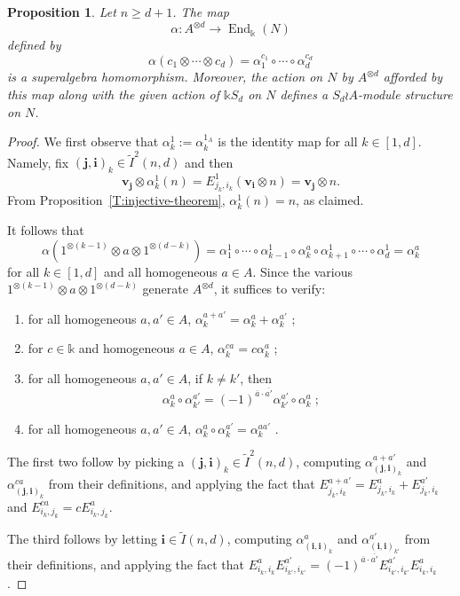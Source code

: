 \documentclass[11pt,reqno]{amsart} %
\newtheorem{proposition}[theorem]{Proposition}
\renewcommand{\k}{\mathds{k}}
\newcommand{\0}{\bar{0}}
\newcommand{\1}{\bar{1}}
\newcommand{\parity}[1]{\overline{#1}}
\newcommand{\wreath}{\wr}
\newcommand{\bv}{\mathbf{v}}
\newcommand{\SdwreathA}{S_{d} \wreath A}
\newcommand{\bi}{\mathbf{i}}
\newcommand{\bj}{\mathbf{j}}
\newcommand{\End}{\operatorname{End}}
\newcommand{\Itwo}{\tilde{I}^{2}(n,d)}
\newcommand{\tI}{\tilde{I}}
\numberwithin{equation}{subsection}
\begin{document}
\begin{proposition} \label{L:alpha-is-an-algebra-map} Let $n \geq d+1$.   The map 
\[
\alpha : A^{\otimes d} \to \End_{\k}(N)
\] defined by 
\[
\alpha(c_{1}\otimes \dotsb \otimes c_{d}) = \alpha_{1}^{c_{1}} \circ \dotsb \circ \alpha_{d}^{c_{d}}
\] is a superalgebra homomorphism.  Moreover, the action on $N$ by $A^{\otimes d}$ afforded by this map along with the given action of $\k S_{d}$ on $N$ defines a $\SdwreathA$-module structure on $N$.
\end{proposition}
\begin{proof} We first observe that $\alpha_{k}^{1}:=\alpha_{k}^{1_{A}}$ is the identity map for all $k \in [1,d]$.  Namely, fix $(\bj, \bi)_{k}\in \Itwo$ and then 
\[
 \bv_{\bj}^{} \otimes \alpha_{k}^{1}(n)   = E_{j_{k}, i_{k}}^{1} ( \bv_{\bi} \otimes n) =  \bv_{\bj}^{} \otimes n.
\]  From Proposition~\ref{T:injective-theorem}, $\alpha_{k}^{1}(n) = n$, as claimed.

It follows that 
\[
\alpha (1^{\otimes (k-1)} \otimes  a \otimes 1^{\otimes (d-k)}) = \alpha_{1}^{1} \circ \dotsb \circ \alpha_{k-1}^{1} \circ \alpha_{k}^{a} \circ \alpha_{k+1}^{1} \circ\dotsb \circ \alpha_{d}^{1} = \alpha_{k}^{a}
\]
for all $k \in [1,d]$ and all homogeneous $a \in A$.  Since the various $1^{\otimes (k-1)} \otimes  a \otimes 1^{\otimes (d-k)}$ generate $A^{\otimes d}$, it suffices to verify:
\begin{enumerate}
\item for all homogeneous $a, a' \in A$, $\alpha_{k}^{a+a'} = \alpha_{k}^{a}+\alpha_{k}^{a'}$ ;
\item for $c \in \k$ and homogeneous $a \in A$, $\alpha_{k}^{ca} = c\alpha_{k}^{a}$ ;
\item for all homogeneous $a, a' \in A$, if $k \neq k'$, then
\[
\alpha_{k}^{a} \circ \alpha_{k'}^{a'}  = (-1)^{\parity{a} \cdot \parity{a'}} \alpha_{k'}^{a'} \circ \alpha_{k}^{a} \; ;\]
\item for all homogeneous $a,a' \in A$, $\alpha_{k}^{a} \circ \alpha_{k}^{a'} = \alpha_{k}^{aa'}$ .
\end{enumerate}

The first two follow by picking a $(\bj , \bi )_{k} \in \Itwo$, computing $\alpha_{(\bj , \bi )_{k}}^{a+a'}$ and $\alpha_{(\bj , \bi )_{k}}^{ca}$ from their definitions, and applying the fact that $E_{j_{k}, i_{k}}^{a+a'} = E_{j_{k}, i_{k}}^{a}+E_{j_{k}, i_{k}}^{a'}$ and $E_{i_{k}, j_{k}}^{ca} = cE_{i_{k}, j_{k}}^{a}$.

The third follows by letting $\bi \in \tI (n,d)$, computing $\alpha_{(\bi , \bi )_{k}}^{a}$ and $\alpha^{a'}_{(\bi , \bi )_{k'}}$ from their definitions, and applying the fact that $E_{i_{k}, i_{k}}^{a}E_{i_{k'}, i_{k'}}^{a'} = (-1)^{\parity{a}\cdot\parity{a'}}E_{i_{k'}, i_{k'}}^{a'}E_{i_{k}, i_{k}}^{a}$.


\end{proof}
\end{document}
